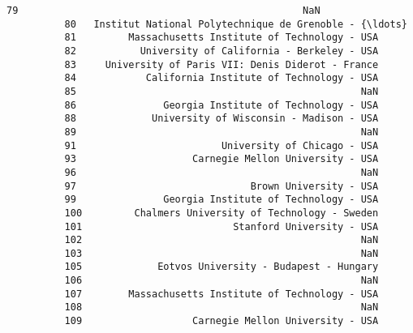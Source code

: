 \documentclass[11pt]{article}
\begin{document}
\begin{Verbatim}[commandchars=\\\{\}]
          79                                                 NaN   
          80   Institut National Polytechnique de Grenoble - {\ldots}   
          81         Massachusetts Institute of Technology - USA   
          82           University of California - Berkeley - USA   
          83     University of Paris VII: Denis Diderot - France   
          84            California Institute of Technology - USA   
          85                                                 NaN   
          86               Georgia Institute of Technology - USA   
          88             University of Wisconsin - Madison - USA   
          89                                                 NaN   
          91                         University of Chicago - USA   
          93                    Carnegie Mellon University - USA   
          96                                                 NaN   
          97                              Brown University - USA   
          99               Georgia Institute of Technology - USA   
          100         Chalmers University of Technology - Sweden   
          101                          Stanford University - USA   
          102                                                NaN   
          103                                                NaN   
          105             Eotvos University - Budapest - Hungary   
          106                                                NaN   
          107        Massachusetts Institute of Technology - USA   
          108                                                NaN   
          109                   Carnegie Mellon University - USA   
          

\end{Verbatim}
\end{document}
